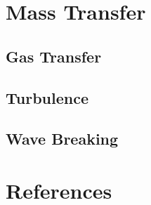 \documentclass{report}
\begin{document}
\chapter{Mass Transfer}
    \lipsum[10]
  
    \section{Gas Transfer}
    \lipsum[1-2]
   
    \section{Turbulence}
    \lipsum[1-2]
  
    \section{Wave Breaking}
    \lipsum[1-2]

\chapter{References}


  
\end{document}
